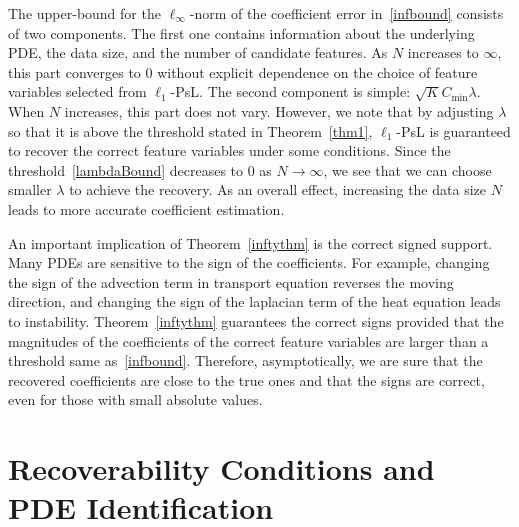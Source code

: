 \documentclass[a4paper,11pt]{article}
\begin{document}
The upper-bound for the $\ell_\infty$-norm of the coefficient error in~\eqref{infbound} consists of two components. The first one contains information about the underlying PDE, the data size, and the number of candidate features. As $N$ increases to $\infty$, this part converges to $0$ without explicit dependence on the choice of feature variables selected from $\ell_1$-PsL. The second component is simple: $\sqrt{K}C_{\min}\lambda$. When $N$ increases, this part does not vary. However, we note that by adjusting $\lambda$ so that it is above the threshold stated in Theorem~\ref{thm1}, $\ell_1$-PsL is guaranteed to recover the correct feature variables under some conditions. Since the threshold~\eqref{lambdaBound} decreases to $0$ as $N\to\infty$, we see that we can choose smaller $\lambda$ to achieve the recovery. As an overall effect,  increasing the data size $N$ leads to more accurate coefficient estimation. 

An important implication of Theorem~\ref{inftythm} is the correct signed support. Many PDEs are sensitive to the sign of the coefficients. For example, changing the sign of the advection term in transport equation reverses the moving direction, and changing the sign of the laplacian term of the heat equation leads to instability.  Theorem~\ref{inftythm} guarantees the correct signs provided that the magnitudes of the coefficients of the correct feature variables are larger than a threshold same as~\ref{infbound}. Therefore, asymptotically, we are sure that the recovered coefficients are close to the true ones and that the signs are correct, even for those with small absolute values.
\section{Recoverability Conditions and PDE Identification}
\end{document}
